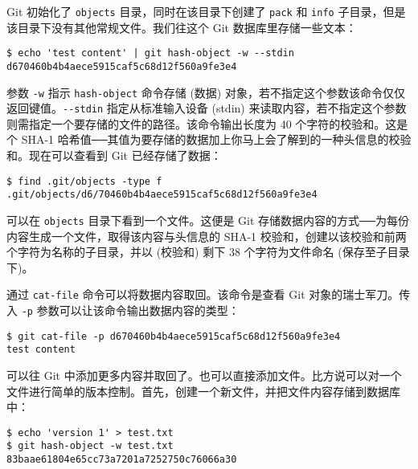 \documentclass[a4paper]{book}
\begin{document}
Git 初始化了 \texttt{objects} 目录，同时在该目录下创建了 \texttt{pack} 和 \texttt{info} 子目录，但是该目录下没有其他常规文件。我们往这个 Git 数据库里存储一些文本：

\begin{shaded}\begin{verbatim}
$ echo 'test content' | git hash-object -w --stdin
d670460b4b4aece5915caf5c68d12f560a9fe3e4
\end{verbatim}\end{shaded}

参数 \texttt{-w} 指示 \texttt{hash-object} 命令存储 (数据) 对象，若不指定这个参数该命令仅仅返回键值。\texttt{-{}-stdin} 指定从标准输入设备 (stdin) 来读取内容，若不指定这个参数则需指定一个要存储的文件的路径。该命令输出长度为 40 个字符的校验和。这是个 SHA-1 哈希值──其值为要存储的数据加上你马上会了解到的一种头信息的校验和。现在可以查看到 Git 已经存储了数据：

\begin{shaded}\begin{verbatim}
$ find .git/objects -type f
.git/objects/d6/70460b4b4aece5915caf5c68d12f560a9fe3e4
\end{verbatim}\end{shaded}

可以在 \texttt{objects} 目录下看到一个文件。这便是 Git 存储数据内容的方式──为每份内容生成一个文件，取得该内容与头信息的 SHA-1 校验和，创建以该校验和前两个字符为名称的子目录，并以 (校验和) 剩下 38 个字符为文件命名 (保存至子目录下)。

通过 \texttt{cat-file} 命令可以将数据内容取回。该命令是查看 Git 对象的瑞士军刀。传入 \texttt{-p} 参数可以让该命令输出数据内容的类型：

\begin{shaded}\begin{verbatim}
$ git cat-file -p d670460b4b4aece5915caf5c68d12f560a9fe3e4
test content
\end{verbatim}\end{shaded}

可以往 Git 中添加更多内容并取回了。也可以直接添加文件。比方说可以对一个文件进行简单的版本控制。首先，创建一个新文件，并把文件内容存储到数据库中：

\begin{shaded}\begin{verbatim}
$ echo 'version 1' > test.txt
$ git hash-object -w test.txt
83baae61804e65cc73a7201a7252750c76066a30
\end{verbatim}\end{shaded}
\end{document}
